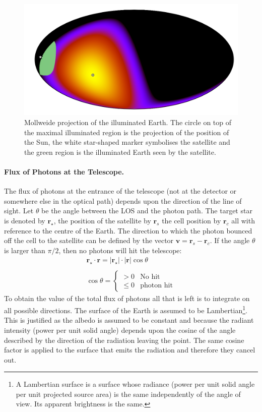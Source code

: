 \documentclass[a4paper,10pt]{article}
\begin{document}
\begin{figure}[!h]
 \begin{center}
  \includegraphics[width=0.6\linewidth]{map-2}
  \caption{Mollweide projection of the illuminated Earth. The circle on top of the maximal illuminated region is the projection of the position of the Sun, the white star-shaped marker symbolises the satellite and the green region is the illuminated Earth seen by the satellite.\label{fig:numerics-illuminated-earth}}
 \end{center}
\end{figure}


\paragraph{Flux of Photons at the Telescope.} The flux of photons at the entrance of the telescope (not at the detector or somewhere else in the optical path) depends upon the direction of the line of sight. Let $\theta$ be the angle between the LOS and the photon path. The target star is denoted by $\pmb{r}_\star$, the position of the satellite by $\pmb{r}_s$ the cell position by $\pmb{r}_c$ all with reference to the centre of the Earth. The direction to which the photon bounced off the cell to the satellite can be defined by the vector $\pmb{v} = \pmb{r}_s-\pmb{r}_c$. If the angle $\theta$ is larger than $\pi/2$, then no photons will hit the telescope:
\begin{eqnarray}
\pmb{r}_\star\cdot \pmb{r} =  |\pmb{r}_\star|\cdot |\pmb{r}|\cos\theta \\
\nonumber\\ 
 \cos \theta = \begin{cases} >0&\text{No hit} \\ \leq 0 & \text{photon hit} \end{cases}
\end{eqnarray}
To obtain the value of the total flux of photons all that is left is to integrate on all possible directions. The surface of the Earth is assumed to be Lambertian\footnote{A Lambertian surface is a surface whose radiance (power per unit solid angle per unit projected source area) is the same independently of the angle of view. Its apparent brightness is the same.}. This is justified as the albedo is assumed to be constant and because the radiant intensity (power per unit solid angle) depends upon the cosine of the angle described by the direction of the radiation leaving the point. The same cosine factor is applied to the surface that emits the radiation and therefore they cancel out.
\end{document}
